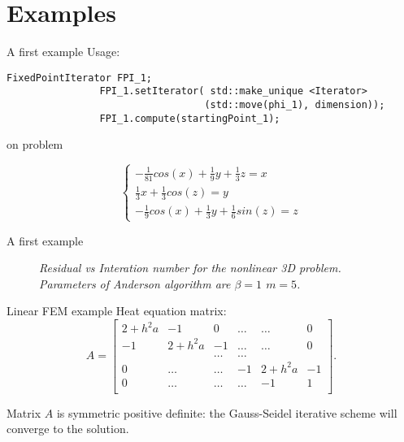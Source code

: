 \documentclass{beamer}
\begin{document}
				\section{Examples}
					
				\begin{frame}[fragile]{A first example}
				Usage:
				
				
				\begin{lstlisting}[basicstyle=\scriptsize]
				FixedPointIterator FPI_1;
				FPI_1.setIterator( std::make_unique <Iterator> 
				                  (std::move(phi_1), dimension));
				FPI_1.compute(startingPoint_1);
				\end{lstlisting}
				
				
				on problem
				
				\begin{equation*}
							\left \lbrace 
									\begin{aligned}
									-\frac{1}{81}cos(x) + \frac{1}{9}y + \frac{1}{3}z = x\\
									\frac{1}{3}x + \frac{1}{3}cos(z) = y\\
									-\frac{1}{9}cos(x) + \frac{1}{3}y + \frac{1}{6}sin(z) = z 
								\end{aligned}
								\right.
				\end{equation*}

				\end{frame}


				\begin{frame}{A first example}			
				\begin{figure}
				{\scriptsize
				}
				\centering
				\caption{\textit{Residual vs Interation number for the nonlinear 3D problem.
				Parameters of Anderson algorithm are $\beta=1$ $m=5$.}}
				\end{figure}
			
				\end{frame}

				\begin{frame}{Linear FEM example}
				Heat equation matrix:
				\begin{equation*}
				A=\left[
				\begin{array}{llllll}
				2+h^2a & -1 & 0 &\ldots&\ldots& 0\\
				-1 & 2+h^2a & -1 &\ldots&\ldots& 0\\
				 &   & \ldots &\ldots& & \\
				0  & \ldots & \ldots &-1 &2+h^2a& -1\\
				0  & \ldots & \ldots &\ldots&-1& 1\\
				\end{array}
				\right].
				\end{equation*}

				Matrix $A$ is symmetric positive definite: the
				Gauss-Seidel iterative scheme will converge to the solution.
				\end{frame}
				
\end{document}
